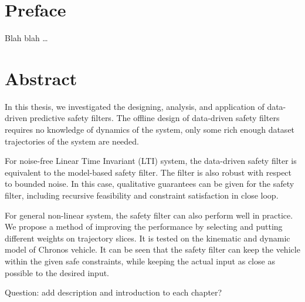 
\chapter*{Preface}

Blah blah \dots

 \cleardoublepage


 \setcounter{tocdepth}{2}
 \tableofcontents

 \cleardoublepage


\chapter*{Abstract}

In this thesis, we investigated the designing, analysis, and application of data-driven predictive safety filters.
The offline design of data-driven safety filters requires no knowledge of dynamics of the system, only some rich enough dataset trajectories of the system are needed.

For noise-free Linear Time Invariant (LTI) system, the data-driven safety filter is equivalent to the model-based safety filter.
The filter is also robust with respect to bounded noise.
In this case, qualitative guarantees can be given for the safety filter, including recursive feasibility and constraint satisfaction in close loop.

For general non-linear system, the safety filter can also perform well in practice.
We propose a method of improving the performance by selecting and putting different weights on trajectory slices.
It is tested on the kinematic and dynamic model of Chronos vehicle.
It can be seen that the safety filter can keep the vehicle within the given safe constraints, while keeping the actual input as close as possible to the desired input.

Question: add description and introduction to each chapter?

